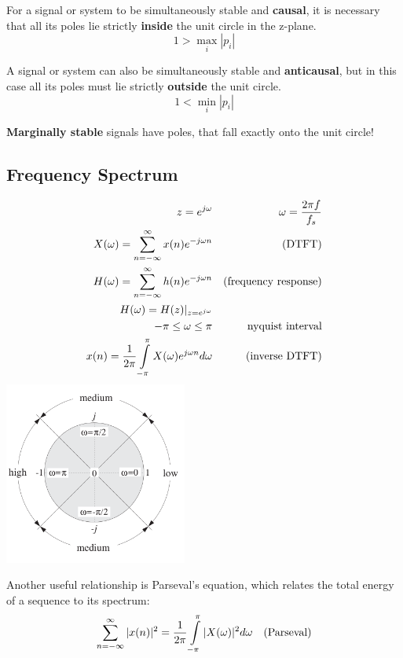 For a signal or system to be simultaneously stable and \textbf{causal}, it is necessary that all its poles lie strictly 
\textbf{inside} the unit circle in the z-plane. 
\[ 1 > \max\limits_{i}|p_i| \]

A signal or system
can also be simultaneously stable and \textbf{anticausal}, but in this case all its poles must lie
strictly \textbf{outside} the unit circle.
\[ 1 < \min\limits_{i}|p_i| \]

\textbf{Marginally stable} signals have poles, that fall exactly onto the unit circle!


\subsection{Frequency Spectrum}
\begin{multicols}{2}
	\begin{align}
	z=e^{j\omega} && \omega = \frac{2 \pi f}{f_s} \notag\\
	X(\omega)= \sum\limits_{n=-\infty}^{\infty} x(n)e^{-j\omega n} &&  \text{(DTFT)} \notag \\
	H(\omega)= \sum\limits_{n=-\infty}^{\infty} h(n)e^{-j\omega n} &&  \text{(frequency response)} \notag \\
	H(\omega)= H(z)|_{z=e^{j\omega}} \notag \\
	 -\pi \leq \omega \leq \pi && \text{nyquist interval}\notag\\
	x(n)= \frac{1}{2\pi} \int\limits_{-\pi}^{\pi} X(\omega)e^{j\omega n} d\omega &&\text{(inverse DTFT)} \notag
	\end{align}
\columnbreak
  \includegraphics[width=6cm]{./picture/freq_spect}
\end{multicols}

Another useful relationship is Parseval’s equation, which relates the total energy of a sequence to its spectrum: 
\begin{align}
\sum_{n=-\infty}^{\infty} |x(n)|^2= \frac{1}{2\pi} \int\limits_{-\pi}^{\pi} |X(\omega)|^2 d\omega && \text{(Parseval)} \notag
\end{align}

